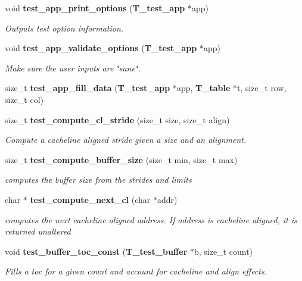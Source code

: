 \begin{CompactItemize}
void {\bf test\_\-app\_\-print\_\-options} ({\bf T\_\-test\_\-app} $\ast$app)
\begin{CompactList}\small\item\em Outputs test option information.\item\end{CompactList}\item 
void {\bf test\_\-app\_\-validate\_\-options} ({\bf T\_\-test\_\-app} $\ast$app)
\begin{CompactList}\small\item\em Make sure the user inputs are \char`\"{}sane\char`\"{}.\item\end{CompactList}\item 
size\_\-t {\bf test\_\-app\_\-fill\_\-data} ({\bf T\_\-test\_\-app} $\ast$app, {\bf T\_\-table} $\ast$t, size\_\-t row, size\_\-t col)
\item 
size\_\-t {\bf test\_\-compute\_\-cl\_\-stride} (size\_\-t size, size\_\-t align)
\begin{CompactList}\small\item\em Compute a cacheline aligned stride given a size and an alignment.\item\end{CompactList}\item 
size\_\-t {\bf test\_\-compute\_\-buffer\_\-size} (size\_\-t min, size\_\-t max)
\begin{CompactList}\small\item\em computes the buffer size from the strides and limits\item\end{CompactList}\item 
char $\ast$ {\bf test\_\-compute\_\-next\_\-cl} (char $\ast$addr)
\begin{CompactList}\small\item\em computes the next cacheline aligned address. If address is cacheline aligned, it is returned unaltered\item\end{CompactList}\item 
void {\bf test\_\-buffer\_\-toc\_\-const} ({\bf T\_\-test\_\-buffer} $\ast$b, size\_\-t count)
\begin{CompactList}\small\item\em Fills a toc for a given count and account for cacheline and align effects.\item\end{CompactList}\item 

\end{CompactItemize}

